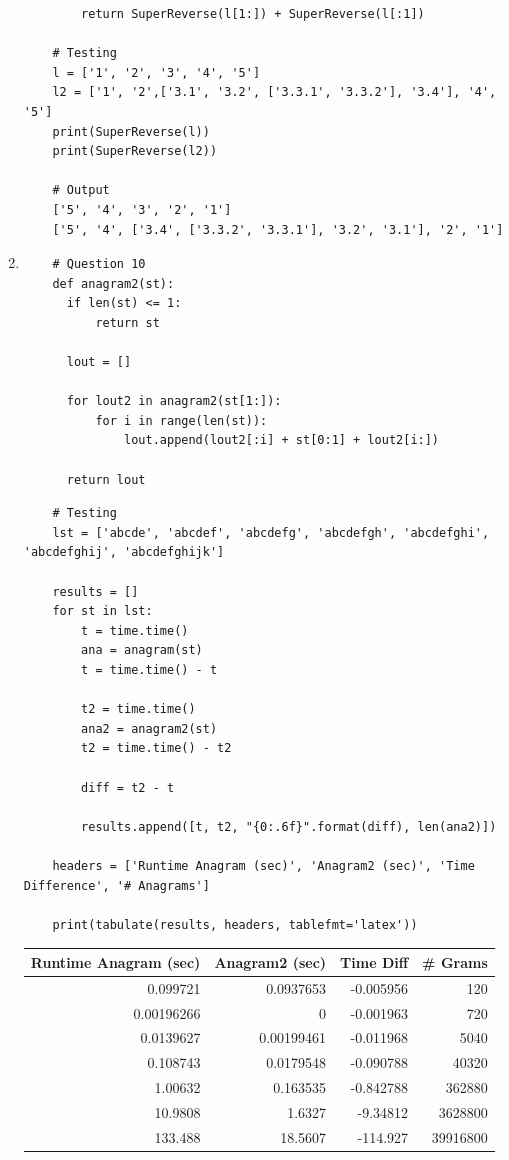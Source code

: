 \documentclass{article}
\begin{document}
\begin{enumerate}
\begin{lstlisting}
        return SuperReverse(l[1:]) + SuperReverse(l[:1])
        
    # Testing
    l = ['1', '2', '3', '4', '5']
    l2 = ['1', '2',['3.1', '3.2', ['3.3.1', '3.3.2'], '3.4'], '4', '5']
    print(SuperReverse(l))
    print(SuperReverse(l2))

    # Output    
    ['5', '4', '3', '2', '1']
    ['5', '4', ['3.4', ['3.3.2', '3.3.1'], '3.2', '3.1'], '2', '1']
  \end{lstlisting}

  \item 
  \begin{lstlisting}
    # Question 10
    def anagram2(st):
      if len(st) <= 1:
          return st

      lout = []
      
      for lout2 in anagram2(st[1:]):
          for i in range(len(st)):
              lout.append(lout2[:i] + st[0:1] + lout2[i:])
              
      return lout
  \end{lstlisting}
  \begin{lstlisting}
    # Testing
    lst = ['abcde', 'abcdef', 'abcdefg', 'abcdefgh', 'abcdefghi', 'abcdefghij', 'abcdefghijk']

    results = []
    for st in lst:
        t = time.time()
        ana = anagram(st)
        t = time.time() - t
    
        t2 = time.time()
        ana2 = anagram2(st)
        t2 = time.time() - t2
        
        diff = t2 - t
        
        results.append([t, t2, "{0:.6f}".format(diff), len(ana2)])
    
    headers = ['Runtime Anagram (sec)', 'Anagram2 (sec)', 'Time Difference', '# Anagrams']
    
    print(tabulate(results, headers, tablefmt='latex'))
  \end{lstlisting}
  \begin{tabular}{rrrr}
    \hline
       Runtime Anagram (sec) &   Anagram2 (sec) &   Time Diff &   \# Grams \\
    \hline
          0.099721   &       0.0937653  &   -0.005956 &       120 \\
          0.00196266 &       0          &   -0.001963 &       720 \\
          0.0139627  &       0.00199461 &   -0.011968 &      5040 \\
          0.108743   &       0.0179548  &   -0.090788 &     40320 \\
          1.00632    &       0.163535   &   -0.842788 &    362880 \\
         10.9808     &       1.6327     &   -9.34812  &   3628800 \\
        133.488      &      18.5607     & -114.927    &  39916800 \\
    \hline
    \end{tabular}
    

\end{enumerate}
\end{document}
